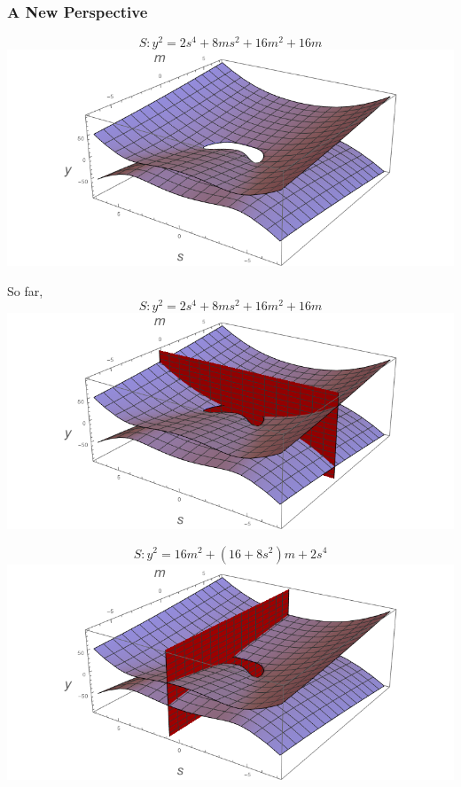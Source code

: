 \begin{frame}[allowframebreaks]
  \frametitle{A New Perspective}
  $$S:y^2 = 2s^4 + 8ms^2 + 16m^2 + 16m$$
  \phantom{hi}
  \includegraphics[width=\textwidth]{SPlot.png}
  
\framebreak
  
  So far,
	$$S:y^2 = 2s^4 + 8ms^2 + 16m^2 + 16m$$
	\phantom{hi}
	\includegraphics[width=\textwidth]{ECPlot.png}

\framebreak

	$$S:y^2 = 16m^2 + (16+8s^2)m + 2s^4$$
	\phantom{hi}
	\includegraphics[width=\textwidth]{CSPlot.png}
	
	\framebreak
	

\end{frame}

